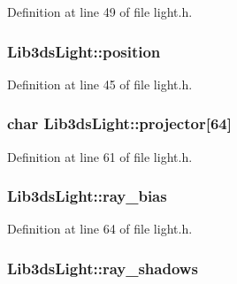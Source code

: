 Definition at line 49 of file light.\-h.

\hypertarget{struct_lib3ds_light_ac0ef4c675c43ac9f7a47236c7e418db6}{
\subsubsection[{position}]{ Lib3ds\-Light\-::position}}\label{struct_lib3ds_light_ac0ef4c675c43ac9f7a47236c7e418db6}


Definition at line 45 of file light.\-h.

\hypertarget{struct_lib3ds_light_ad6f72bfdaa171683ea89213cac2f95f3}{
\subsubsection[{projector}]{\setlength{\rightskip}{0pt plus 5cm}char Lib3ds\-Light\-::projector\mbox{[}64\mbox{]}}}\label{struct_lib3ds_light_ad6f72bfdaa171683ea89213cac2f95f3}


Definition at line 61 of file light.\-h.

\hypertarget{struct_lib3ds_light_adc313b1c6a1ded43dc4bfe942234b54c}{
\subsubsection[{ray\-\_\-bias}]{ Lib3ds\-Light\-::ray\-\_\-bias}}\label{struct_lib3ds_light_adc313b1c6a1ded43dc4bfe942234b54c}


Definition at line 64 of file light.\-h.

\hypertarget{struct_lib3ds_light_a405dbdabfcd5ef4a9794c42338481e4f}{
\subsubsection[{ray\-\_\-shadows}]{ Lib3ds\-Light\-::ray\-\_\-shadows}}\label{struct_lib3ds_light_a405dbdabfcd5ef4a9794c42338481e4f}


